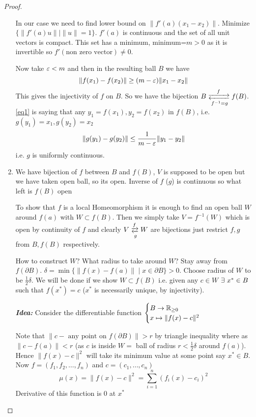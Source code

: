 \begin{proof}
\begin{enumerate}[label=\bfseries\tiny\protect\circled{\small\arabic*}]
In our case we need to find lower bound on $\|f'(a)(x_1-x_2)\|$. Minimize $\{\|f'(a)u\|\mid \|u\|=1\}$. $f'(a)$ is continuous and the set of all unit vectors is compact. This set has a minimum, minimum=$m>0$ as it is invertible so $f'(\text{non zero vector})\neq 0$. 

Now take $\varepsilon<m$ and then in the resulting ball $B$ we have \begin{equation}
	\|f(x_1)-f(x_2)\|\geq (m-\varepsilon)\|x_1-x_2\|\label{eq1}
\end{equation}This gives the injectivity of $f$ on $B$. So we have the bijection $B\mathrel{\raisebox{2pt}{$\xrightarrow{\ \ \  f\ \ \ }$}
\llap{\raisebox{-2pt}{$\xleftarrow[f^{-1}=g]{}$}}}f(B)$. \eqref{eq1} is saying that any $y_1=f(x_1), y_2=f(x_2)$ in $f(B)$, i.e. $g(y_1)=x_1,g(y_2)=x_2$ $$\|g(y_1)-g(y_2)\|\leq \frac{1}{m-\varepsilon}\|y_1-y_2\|$$ i.e. $g$ is uniformly continuous.

\item We have bijection of $f$ between $B$ and $f(B)$, $V$ is supposed to be open but we have taken open ball, so its open. Inverse of $f$ ($g$) is continuous so what left is $f(B)$ open\parinn

To show that $f$ is a local Homeomorphism it is enough to find an open ball $W$ around $f(a)$ with $W\subset f(B)$. Then we simply take $V=f^{-1}(W)$ which is open by continuity of $f$ and clearly $V\mathrel{\raisebox{2pt}{$\xrightarrow{f}$}
	\llap{\raisebox{-2pt}{$\xleftarrow[g]{}$}}}W$ are bijections just restrict $f,g$ from $B,f(B)$ respectively.

How to construct $W$? What radius to take around $W$? Stay away from $f(\partial B)$. $\delta=\min\{ \|f(x)-f(a)\| \mid x\in \partial B  \}>0$. Choose radius of $W$ to be $\frac12\delta$. We will be done if we show $W\subset f(B)$ i.e. given any $c\in W$ $\exists\ x^*\in B$ such that $f(x^*)=c$ ($x^*$ is necessarily unique, by injectivity).\parinf

\textbf{\textit{Idea: }}Consider the differentiable function $\begin{cases}
	B\to \mathbb{R}_{\geq 0}\\ x\mapsto \|f(x)-c\|^2
\end{cases}$\parinn


Note that $\|c-\text{ any point on }f(\partial B)\|>r$ by triangle inequality where as $\|c-f(a)\|<r$ (as $c$ is inside $W=$ ball of radius $r<\frac12\delta$ around $f(a)$). Hence $\|f(x)-c\|^2$ will take its minimum value at some point say $x^*\in B$. Now $f=(f_1,f_2,\dots,f_n)$ and $c=(c_1,\dots,c_n)$ $$\mu(x)=\|f(x)-c\|^2=\sum_{i=1}^n (f_i(x)-c_i)^2$$Derivative of this function is $0$ at $x^*$


\end{enumerate}
\end{proof}
